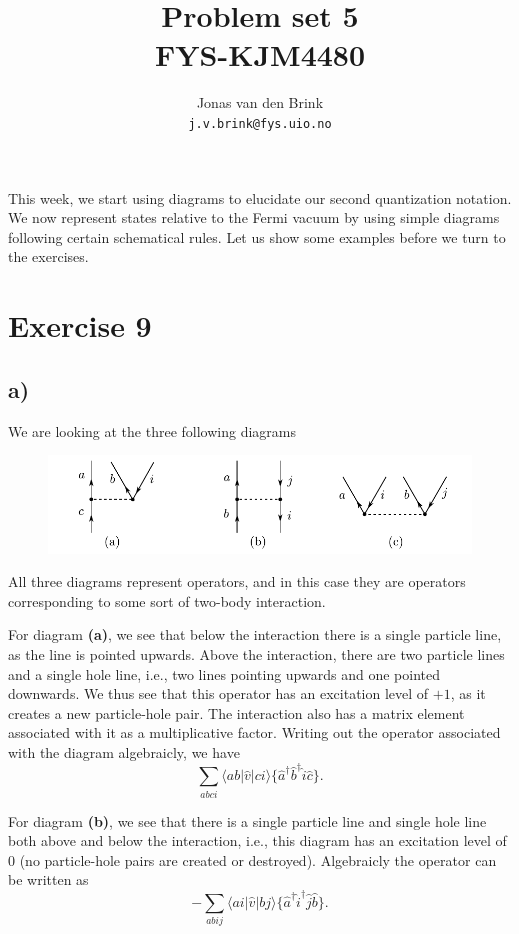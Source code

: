 \documentclass[a4paper, 11pt, notitlepage, english]{article}
\author{Jonas van den Brink \\ \texttt{j.v.brink@fys.uio.no}}
\title{Problem set 5 \\ FYS-KJM4480}
\newcommand{\op}[1]{\hat{#1}}
\newcommand{\braopket}[3]{\langle #1 | {#2} | #3 \rangle}
\begin{document}
\maketitle

This week, we start using diagrams to elucidate our second quantization notation. We now represent states relative to the Fermi vacuum by using simple diagrams following certain schematical rules. Let us show some examples before we turn to the exercises.

\section*{Exercise 9}
\subsection*{a)}

We are looking at the three following diagrams
\begin{figure}[h!]
	\centering
	\includegraphics[width=\textwidth]{exercise9a}
\end{figure}

All three diagrams represent operators, and in this case they are operators corresponding to some sort of two-body interaction.

For diagram \textbf{(a)}, we see that below the interaction there is a single particle line, as the line is pointed upwards. Above the interaction, there are two particle lines and a single hole line, i.e., two lines pointing upwards and one pointed downwards. We thus see that this operator has an excitation level of $+1$, as it creates a new particle-hole pair. The interaction also has a matrix element associated with it as a multiplicative factor. Writing out the operator associated with the diagram algebraicly, we have 
$$\sum_{abci} \braopket{ab}{\op{v}}{ci}\{\op{a}^\dagger\op{b}^\dagger\op{i}\op{c}\}.$$

For diagram \textbf{(b)}, we see that there is a single particle line and single hole line both above and below the interaction, i.e., this diagram has an excitation level of 0 (no particle-hole pairs are created or destroyed). Algebraicly the operator can be written as
$$-\sum_{abij}\braopket{ai}{\op{v}}{bj}\{\op{a}^\dagger\op{i}^\dagger\op{j}\op{b}\}.$$
\end{document}
